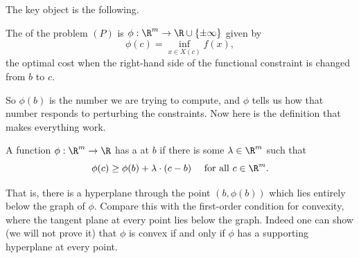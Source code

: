 \documentclass[a4paper]{scrartcl}
\begin{document}
The key object is the following.

\begin{definition}
    The  of the problem $(P)$ is $\phi : \R^m \rightarrow \R \cup \{\pm\infty\}$ given by
    $$
    \phi(c) = \inf_{x \in X(c)}f(x),
    $$
    the optimal cost when the right-hand side of the functional constraint is changed from $b$ to $c$.
\end{definition}

So $\phi(b)$ is the number we are trying to compute, and $\phi$ tells us how that number responds to perturbing the constraints. Now here is the definition that makes everything work.

\begin{definition}
    A function $\phi : \R^m \rightarrow \R$ has a  at $b$ if there is some $\lambda \in \R^m$ such that
    $$
    \phi(c) \geq \phi(b) + \lambda\cdot(c - b) \quad\text{ for all } c \in \R^m.
    $$
\end{definition}

That is, there is a hyperplane through the point $(b, \phi(b))$ which lies entirely below the graph of $\phi$. Compare this with the first-order condition for convexity, where the tangent plane at every point lies below the graph. Indeed one can show (we will not prove it) that $\phi$ is convex if and only if $\phi$ has a supporting hyperplane at every point.

\begin{center}
\end{center}
\end{document}
